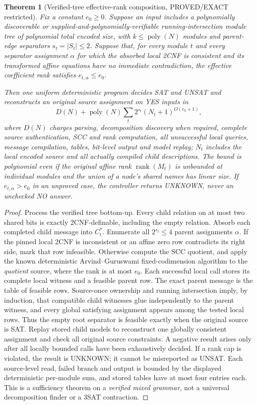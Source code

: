\documentclass[11pt]{article}
\newtheorem{theorem}{Theorem}
\begin{document}
\begin{theorem}[Verified-tree effective-rank composition, PROVED/EXACT restricted]
Fix a constant $e_0\ge0$. Suppose an input includes a polynomially discoverable or supplied-and-polynomially-verifiable running-intersection module tree of polynomial total encoded size, with $k\le\operatorname{poly}(N)$ modules and parent-edge separators $s_t=|S_t|\le2$. Suppose that, for every module $t$ and every separator assignment $\alpha$ for which the absorbed local 2CNF is consistent and its transformed affine equations have no immediate contradiction, the \emph{effective} coefficient rank satisfies $e_{t,\alpha}\le e_0$.

Then one uniform deterministic program decides SAT and UNSAT and reconstructs an original source assignment on YES inputs in
\[
\boxed{D(N)+\operatorname{poly}(N)\sum_t 2^{s_t}(N_t+1)^{O(e_0+1)}},
\]
where $D(N)$ charges parsing, decomposition discovery when required, complete source authentication, SCC and rank computation, all unsuccessful local queries, message compilation, tables, bit-level output and model replay; $N_t$ includes the local encoded source and all actually compiled child descriptions. The bound is polynomial even if the original affine rank $\operatorname{rank}(M_t)$ is unbounded at individual modules and the union of a node's shared names has linear size. If $e_{t,\alpha}>e_0$ in an unproved case, the controller returns UNKNOWN, never an unchecked NO answer.
\end{theorem}
\begin{proof}
Process the verified tree bottom-up. Every child relation on at most two shared bits is exactly 2CNF-definable, including the empty relation. Absorb each completed child message into $C_t^*$. Enumerate all $2^{s_t}\le4$ parent assignments $\alpha$. If the pinned local 2CNF is inconsistent or an affine zero row contradicts its right side, mark that row infeasible. Otherwise compute the SCC quotient, and apply the known deterministic Arvind--Guruswami fixed-codimension algorithm to the \emph{quotient} source, where the rank is at most $e_0$. Each successful local call stores its complete local witness and a feasible parent row. The exact parent message is the table of feasible rows. Source-once ownership and running intersection imply, by induction, that compatible child witnesses glue independently to the parent witness, and every global satisfying assignment appears among the tested local rows. Thus the empty root separator is feasible exactly when the original source is SAT. Replay stored child models to reconstruct one globally consistent assignment and check all original source constraints. A negative result arises only after all locally bounded calls have been exhaustively decided. If a rank cap is violated, the result is UNKNOWN; it cannot be misreported as UNSAT. Each source-level read, failed branch and output is bounded by the displayed deterministic per-module sum, and stored tables have at most four entries each. This is a sufficiency theorem on a \emph{verified mixed grammar}, not a universal decomposition finder or a 3SAT contraction.
\end{proof}
\end{document}
